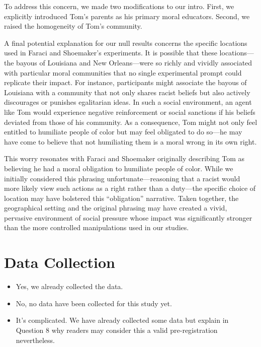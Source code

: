 \documentclass[scrarticle]{scrartcl}
\begin{document}
To address this concern, we made two modifications to our intro.
First, we explicitly introduced Tom's parents as his primary moral educators.
Second, we raised the homogeneity of Tom's community.

A final potential explanation for our null results concerns the specific locations used in Faraci and Shoemaker's experiments.
It is possible that these locations---the bayous of Louisiana and New Orleans---were so richly and vividly associated with particular moral communities that no single experimental prompt could replicate their impact.
For instance, participants might associate the bayous of Louisiana with a community that not only shares racist beliefs but also actively discourages or punishes egalitarian ideas.
In such a social environment, an agent like Tom would experience negative reinforcement or social sanctions if his beliefs deviated from those of his community.
As a consequence, Tom might not only feel entitled to humiliate people of color but may feel obligated to do so---he may have come to believe that not humiliating them is a moral wrong in its own right.

This worry resonates with Faraci and Shoemaker originally describing Tom as believing he had a moral obligation to humiliate people of color.
While we initially considered this phrasing unfortunate---reasoning that a racist would more likely view such actions as a right rather than a duty---the specific choice of location may have bolstered this \enquote{obligation} narrative.
Taken together, the geographical setting and the original phrasing may have created a vivid, pervasive environment of social pressure whose impact was significantly stronger than the more controlled manipulations used in our studies.


\section{Data Collection}
\begin{itemize}[label=\Square,noitemsep]
   \item Yes, we already collected the data.
   \item[\XBox] No, no data have been collected for this study yet.
   \item It's complicated. We have already collected some data but explain in Question $8$ why readers may consider this a valid pre-registration nevertheless.
\end{itemize}
\end{document}
